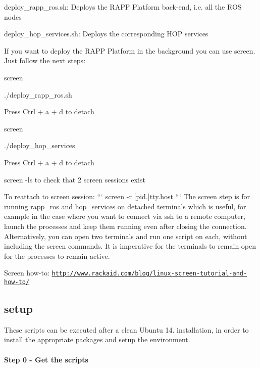 \begin{DoxyItemize}
\item {\ttfamily deploy\-\_\-rapp\-\_\-ros.\-sh}\-: Deploys the R\-A\-P\-P Platform back-\/end, i.\-e. all the R\-O\-S nodes
\item {\ttfamily deploy\-\_\-hop\-\_\-services.\-sh}\-: Deploys the corresponding H\-O\-P services
\end{DoxyItemize}

If you want to deploy the R\-A\-P\-P Platform in the background you can use {\ttfamily screen}. Just follow the next steps\-:


\begin{DoxyItemize}
\item {\ttfamily screen}
\item {\ttfamily ./deploy\-\_\-rapp\-\_\-ros.sh}
\item Press Ctrl + a + d to detach
\item {\ttfamily screen}
\item {\ttfamily ./deploy\-\_\-hop\-\_\-services}
\item Press Ctrl + a + d to detach
\item {\ttfamily screen -\/ls} to check that 2 screen sessions exist
\end{DoxyItemize}

To reattach to screen session\-: ``` screen -\/r \mbox{[}pid.\mbox{]}tty.\-host ``` The screen step is for running rapp\-\_\-ros and hop\-\_\-services on detached terminals which is useful, for example in the case where you want to connect via ssh to a remote computer, launch the processes and keep them running even after closing the connection. Alternatively, you can open two terminals and run one script on each, without including the screen commands. It is imperative for the terminals to remain open for the processes to remain active.

Screen how-\/to\-: \href{http://www.rackaid.com/blog/linux-screen-tutorial-and-how-to/}{\tt http\-://www.\-rackaid.\-com/blog/linux-\/screen-\/tutorial-\/and-\/how-\/to/}

\subsection*{setup}

These scripts can be executed after a clean Ubuntu 14. installation, in order to install the appropriate packages and setup the environment.

\paragraph*{Step 0 -\/ Get the scripts}

